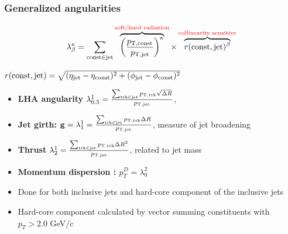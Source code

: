 \documentclass[10pt, aspectratio = 169]{beamer}
\begin{document}
		\begin{frame}
		\frametitle{Generalized angularities}
		
		\begin{align}
			\lambda_\beta^\kappa=\sum_{\mathrm{const} \in \mathrm{jet}}\overbrace{ \left(\frac{p_{\rm T, const}}{p_ {\rm T,  jet}}\right)^\kappa}^{\text{\color{red} soft/hard radiation}} \times \overbrace{r(\mathrm{const, jet})^\beta}^{\text{\color{red}collinearity sensitive}} \notag 
		\end{align}
		
		\small$r(\mathrm{const, jet}) = \sqrt{(\eta_{\rm jet}-\eta_{\rm const})^2 + (\phi_{\rm jet}-\phi_{\rm const})^2} $
		
		\begin{itemize}
			\item \textbf{LHA angularity} $\lambda_{0.5}^1 =\frac{\sum_{\rm trk\in jet} p_{\rm T, trk} \sqrt{\Delta R}}{p_{\rm T, jet}} $,
			\item \textbf{Jet girth: } $\mathbf{g} = \lambda_1^1 =\frac{\sum_{\rm trk\in jet} p_{\rm T, trk} \Delta R}{p_{\rm T, jet}}$, measure of jet broadening
			\item \textbf{Thrust} $\lambda_2^1 =\frac{\sum_{\rm trk\in jet} p_{\rm T, trk} \Delta R^2}{p_{\rm T, jet}} $, related to jet mass
			\item \textbf{Momentum dispersion : $p_T^D = \lambda^2_0$} 
			
			\item Done for both inclusive jets and hard-core component of the inclusive jets
			\item Hard-core component calculated by vector summing constituents with $p_T > 2.0$ GeV/c
		\end{itemize}
	\end{frame}
	
\end{document}
